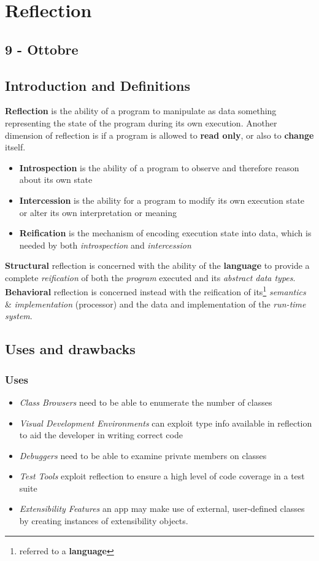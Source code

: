 \chapter{Reflection}
\section*{9 - Ottobre}
\section{Introduction and Definitions}

\textbf{Reflection} is the ability of a program to manipulate as data something representing the state of the program during its own execution.
Another dimension of reflection is if a program is
allowed to \textbf{read only}, or also to \textbf{change} itself.
\begin{itemize}
    \item \textbf{Introspection} is the ability of a program to observe and
    therefore reason about its own state
    \item \textbf{Intercession} is the ability for a program to modify its
    own execution state or alter its own interpretation or
    meaning
    \item \textbf{Reification} is the mechanism of encoding execution state into data, which is needed by both \textit{introspection} and \textit{intercession}
\end{itemize}

\textbf{Structural} reflection  is concerned with the ability of the \textbf{language} to provide a complete \textit{reification} of both the \textit{program} executed and its \textit{abstract data types}.\\
\textbf{Behavioral} reflection is concerned instead with the reification of its\footnote{referred to a \textbf{language}} \textit{semantics} \& \textit{implementation} (processor) and the data and implementation of the \textit{run-time system}.

\section{Uses and drawbacks}
\subsection{Uses}
\begin{itemize}
    \item \textit{Class Browsers} need to be able to enumerate the number of classes
    \item \textit{Visual Development Environments} can exploit type info available in reflection to aid the developer in writing correct code
    \item \textit{Debuggers} need to be able to examine private members on classes
    \item \textit{Test Tools} exploit reflection to ensure a high level of code coverage in a test suite
    \item \textit{Extensibility Features} an app may make use of external, user-defined classes by creating instances of extensibility objects.
\end{itemize}

